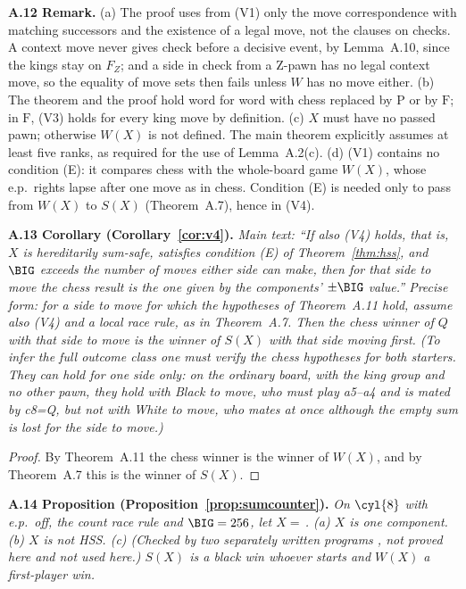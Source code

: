 \textbf{A.12 Remark.} (a) The proof uses from (V1) only the move correspondence with matching successors and the existence of a legal move, not the
clauses on checks. A context move never gives check before a decisive event, by Lemma~A.10, since the kings stay on $F_Z$;
and a side in check from a Z-pawn has no legal context move, so the equality of move sets then fails unless $W$ has no move
either. (b) The theorem and the proof hold word for word
with chess replaced by $\mathrm{P}$ or by $\mathrm{F}$; in $\mathrm{F}$, (V3) holds for every king move by definition.
(c) $X$ must have no passed pawn; otherwise $W(X)$ is not defined. The main theorem explicitly assumes at least five ranks, as required for the use of Lemma~A.2(c).
(d) (V1) contains no condition (E): it compares chess with the whole-board game $W(X)$, whose e.p.\ rights lapse after one move as in chess. Condition (E) is needed only to pass from $W(X)$ to $S(X)$ (Theorem~A.7), hence in (V4).

\textbf{A.13 Corollary (Corollary~\ref{cor:v4}).} \emph{Main text: ``If also (V4) holds, that is, $X$ is hereditarily sum-safe, satisfies condition (E) of Theorem~\ref{thm:hss}, and $\BIG$ exceeds the number of moves either side can make, then for that side to move the chess result is the one given by the components' $\pm\BIG$ value.'' Precise form: for a side to move for which the hypotheses of Theorem~A.11 hold, assume also (V4) and a local race rule, as in Theorem~A.7. Then the chess winner of $Q$ with that side to move is the winner of $S(X)$ with that side moving first. (To infer the full outcome class one must verify the chess hypotheses for both starters. They can hold for one side only: on the ordinary board, with the king group  and no other pawn, they hold with Black to move, who must play a5--a4 and is mated by c8=Q, but not with White to move, who mates at once although the empty sum is lost for the side to move.)}

\begin{proof}
By Theorem~A.11 the chess winner is the winner of $W(X)$, and by Theorem~A.7 this is the winner of $S(X)$.
\end{proof}

\textbf{A.14 Proposition (Proposition~\ref{prop:sumcounter}).} \emph{On $\cyl{8}$ with e.p.\ off, the count race rule and $\BIG=256$, let
$X=$\,. (a) $X$ is one component. (b) $X$ is not HSS. (c) (Checked by two separately written programs , not
proved here and not used here.) $S(X)$ is a black win whoever starts and $W(X)$ a first-player win.}

